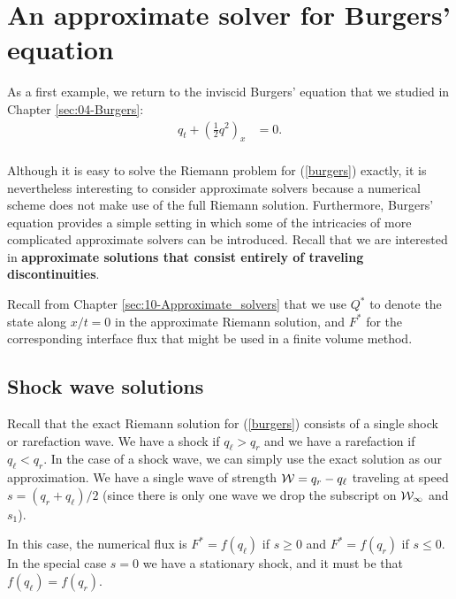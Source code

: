 \documentclass{SIAMbook2016}
\begin{document}
\hypertarget{an-approximate-solver-for-burgers-equation}{%
\chapter{An approximate solver for Burgers'
equation}\label{an-approximate-solver-for-burgers-equation}}
\label{sec:11-Burgers_approximate}
As a first example, we return to the inviscid Burgers' equation that we
studied in Chapter \ref{sec:04-Burgers}:\\
\begin{align} \label{burgers}
q_t + \left(\frac{1}{2}q^2\right)_x & = 0.
\end{align}\\
Although it is easy to solve the Riemann problem for (\ref{burgers})
exactly, it is nevertheless interesting to consider approximate solvers
because a numerical scheme does not make use of the full Riemann
solution. Furthermore, Burgers' equation provides a simple setting in
which some of the intricacies of more complicated approximate solvers
can be introduced. Recall that we are interested in \textbf{approximate
solutions that consist entirely of traveling discontinuities}.

Recall from Chapter \ref{sec:10-Approximate_solvers} that we use \(Q^*\)
to denote the state along \(x/t = 0\) in the approximate Riemann
solution, and \(F^*\) for the corresponding interface flux that might be
used in a finite volume method.

\hypertarget{shock-wave-solutions}{%
\section{Shock wave solutions}\label{shock-wave-solutions}}

Recall that the exact Riemann solution for (\ref{burgers}) consists of a
single shock or rarefaction wave. We have a shock if \(q_\ell>q_r\) and
we have a rarefaction if \(q_\ell < q_r\). In the case of a shock wave,
we can simply use the exact solution as our approximation. We have a
single wave of strength \({\cal W} = q_r-q_\ell\) traveling at speed
\(s=(q_r+q_\ell)/2\) (since there is only one wave we drop the subscript
on \({\cal W_1}\) and \(s_1\)).

In this case, the numerical flux is \(F^*=f(q_\ell)\) if \(s\geq 0\) and
\(F^*=f(q_r)\) if \(s\leq 0\). In the special case \(s=0\) we have a
stationary shock, and it must be that \(f(q_\ell)=f(q_r)\).
\end{document}
